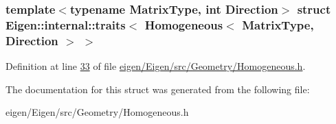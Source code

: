 \subsubsection*{template$<$typename Matrix\+Type, int Direction$>$\newline
struct Eigen\+::internal\+::traits$<$ Homogeneous$<$ Matrix\+Type, Direction $>$ $>$}



Definition at line \hyperlink{eigen_2_eigen_2src_2_geometry_2_homogeneous_8h_source_l00033}{33} of file \hyperlink{eigen_2_eigen_2src_2_geometry_2_homogeneous_8h_source}{eigen/\+Eigen/src/\+Geometry/\+Homogeneous.\+h}.



The documentation for this struct was generated from the following file\+:\begin{DoxyCompactItemize}
\item 
eigen/\+Eigen/src/\+Geometry/\+Homogeneous.\+h\end{DoxyCompactItemize}
